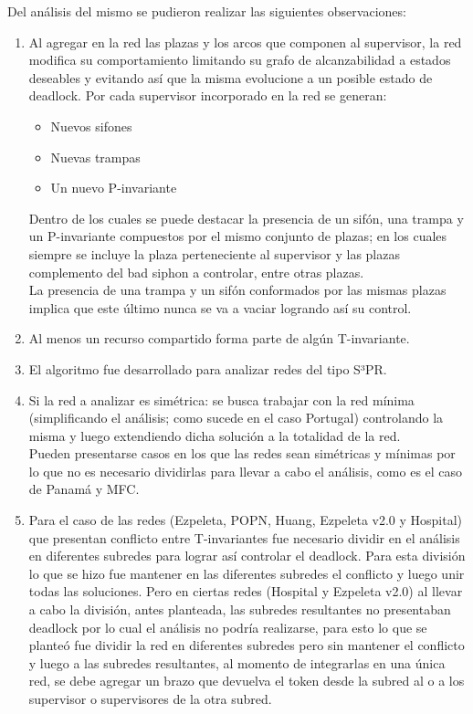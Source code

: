 \noindent Del análisis del mismo se pudieron realizar las siguientes observaciones:
\begin{enumerate}
    \item Al agregar en la red las plazas y los arcos que componen al supervisor, la red modifica su comportamiento limitando su grafo de alcanzabilidad a estados deseables y evitando así que la misma evolucione a un posible estado de deadlock.
    Por cada supervisor incorporado en la red se generan:
    \begin{itemize}
        \item Nuevos sifones
        \item Nuevas trampas
        \item Un nuevo P-invariante
    \end{itemize}
    Dentro de los cuales se puede destacar la presencia de un sifón, una trampa y un P-invariante compuestos por el mismo conjunto de plazas; en los cuales siempre se incluye la plaza perteneciente al supervisor y las plazas complemento del bad siphon a controlar, entre otras plazas.\\ 
    La presencia de una trampa y un sifón conformados por las mismas plazas implica que este último nunca se va a vaciar logrando así su control.
    
    \item Al menos un recurso compartido forma parte de algún T-invariante.
    
    \item El algoritmo fue desarrollado para analizar redes del tipo S³PR.
    
    \item Si la red a analizar es simétrica: se busca trabajar con la red mínima (simplificando el análisis; como sucede en el caso Portugal) controlando la misma y luego extendiendo dicha solución a la totalidad de la red. \\
    Pueden presentarse casos en los que las redes sean simétricas y mínimas por lo que no es necesario dividirlas para llevar a cabo el análisis, como es el caso de Panamá y MFC.
    
    \item Para el caso de las redes (Ezpeleta, POPN, Huang, Ezpeleta v2.0 y Hospital) que presentan conflicto entre T-invariantes fue necesario dividir en el análisis en diferentes subredes para lograr así controlar el deadlock. Para esta división lo que se hizo fue mantener en las diferentes subredes el conflicto y luego unir todas las soluciones. Pero en ciertas redes (Hospital y Ezpeleta v2.0) al llevar a cabo la división, antes planteada, las subredes resultantes no presentaban deadlock por lo cual el análisis no podría realizarse, para esto lo que se planteó fue dividir la red en diferentes subredes pero sin mantener el conflicto y luego a las subredes resultantes, al momento de integrarlas en una única red,  se debe agregar un brazo que devuelva el token desde la subred al o a los supervisor o supervisores de la otra subred.
    

\end{enumerate}
